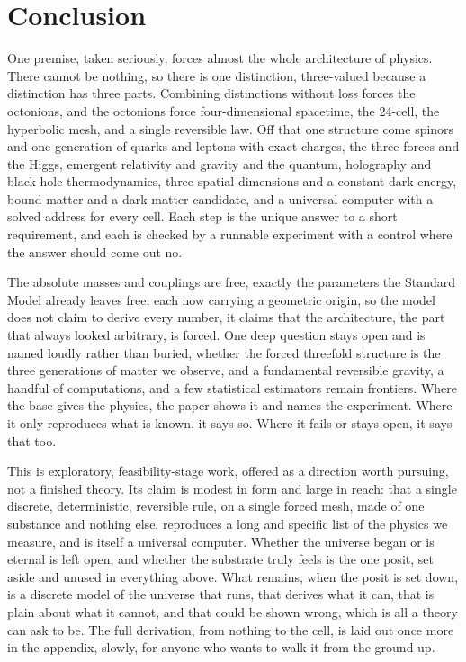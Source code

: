 \section{Conclusion}

One premise, taken seriously, forces almost the whole architecture of physics. There cannot be nothing, so there is one
distinction, three-valued because a distinction has three parts. Combining distinctions without loss forces the
octonions, and the octonions force four-dimensional spacetime, the 24-cell, the hyperbolic mesh, and a single
reversible law. Off that one structure come spinors and one generation of quarks and leptons with exact charges, the
three forces and the Higgs, emergent relativity and gravity and the quantum, holography and black-hole thermodynamics,
three spatial dimensions and a constant dark energy, bound matter and a dark-matter candidate, and a universal computer
with a solved address for every cell. Each step is the unique answer to a short requirement, and each is checked by a
runnable experiment with a control where the answer should come out no.

The absolute masses and couplings are free, exactly the parameters the Standard Model already leaves free, each now
carrying a geometric origin, so the model does not claim to derive every number, it claims that the architecture, the
part that always looked arbitrary, is forced. One deep question stays open and is named loudly rather than buried,
whether the forced threefold structure is the three generations of matter we observe, and a fundamental reversible
gravity, a handful of computations, and a few statistical estimators remain frontiers. Where the base gives the physics,
the paper shows it and names the experiment. Where it only reproduces what is known, it says so. Where it fails or
stays open, it says that too.

This is exploratory, feasibility-stage work, offered as a direction worth pursuing, not a finished theory. Its claim is
modest in form and large in reach: that a single discrete, deterministic, reversible rule, on a single forced mesh,
made of one substance and nothing else, reproduces a long and specific list of the physics we measure, and is itself a
universal computer. Whether the universe began or is eternal is left open, and whether the substrate truly feels is the
one posit, set aside and unused in everything above. What remains, when the posit is set down, is a discrete model of the
universe that runs, that derives what it can, that is plain about what it cannot, and that could be shown wrong, which is
all a theory can ask to be. The full derivation, from nothing to the cell, is laid out once more in the appendix, slowly,
for anyone who wants to walk it from the ground up.
